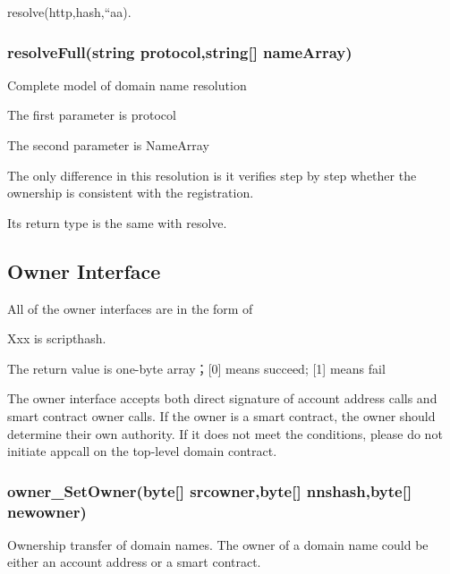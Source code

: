 \documentclass[letterpaper,10pt,english]{sphinxmanual}
\begin{document}
%
\begin{sphinxVerbatim}[commandchars=\\\{\}]
resolve(\PYGZdq{}http\PYGZdq{},hash,“aa\PYGZdq{}).
\end{sphinxVerbatim}


\subsubsection{resolveFull(string protocol,string{[}{]} nameArray)}
\label{\detokenize{nns_protocol:resolvefull-string-protocol-string-namearray}}
Complete model of domain name resolution

The first parameter is protocol

The second parameter is NameArray

The only difference in this resolution is it verifies step by step whether the ownership is consistent with the registration.

Its return type is the same with resolve.


\subsection{Owner Interface}
\label{\detokenize{nns_protocol:owner-interface}}
All of the owner interfaces are in the form of

%
\begin{sphinxVerbatim}[commandchars=\\\{\}]
\PYG{p}{[}\PYG{p}{]} \PYG{p}{[}\PYG{p}{]} \PYG{p}{[}\PYG{p}{]} 
\end{sphinxVerbatim}

Xxx is  scripthash.

The return value is one-byte array；{[}0{]} means succeed; {[}1{]} means fail

The owner interface accepts both direct signature of account address calls and smart contract owner calls.
If the owner is a smart contract, the owner should determine their own authority.
If it does not meet the conditions, please do not initiate appcall on the top-level domain contract.


\subsubsection{owner\_SetOwner(byte{[}{]} srcowner,byte{[}{]} nnshash,byte{[}{]} newowner)}
\label{\detokenize{nns_protocol:owner-setowner-byte-srcowner-byte-nnshash-byte-newowner}}
Ownership transfer of domain names. The owner of a domain name could be either an account address or a smart contract.
\end{document}
